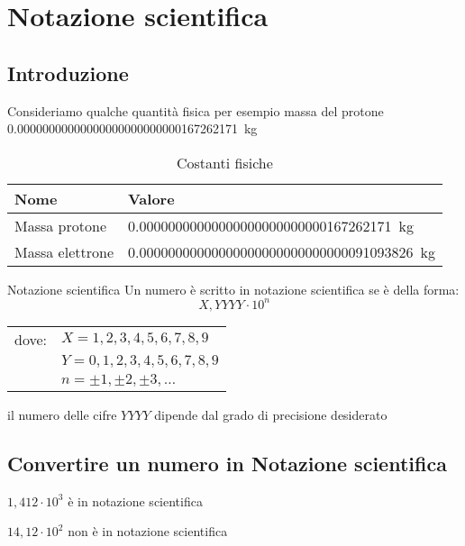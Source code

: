 \chapter{Notazione scientifica}
\section{Introduzione}
Consideriamo qualche quantità fisica per esempio massa del protone \SI{0,00000000000000000000000000167262171}{\kilogram}


\begin{table}
	\centering
	\begin{tabular}{ls}
		\toprule
		Nome&Valore\\
		\midrule
	Massa protone&\SI{0,00000000000000000000000000167262171}{\kilogram}\\
	Massa elettrone&\SI{0,00000000000000000000000000000091093826}{\kilogram}\\
		\bottomrule
	\end{tabular}
\caption{Costanti fisiche}
\label{tab:costantifisiche1}
\end{table}
\label{cha:NotazioneScientifica}
\begin{definizionet}{Notazione scientifica}{}
Un numero è scritto in notazione scientifica se è della forma:
\[X,YYYY \cdot 10^n \]
\begin{tabular}{ll}
dove:&    $X=1,2,3,4,5,6,7,8,9$  \\ 
	    &     $ Y=0,1,2,3,4,5,6,7,8,9$ \\ 
	   &  $n=\pm 1, \pm 2,\pm 3,\ldots$\\
\end{tabular}
 
il numero delle cifre $YYYY$ dipende dal grado di precisione desiderato
\end{definizionet}
\section{Convertire un numero in Notazione scientifica}
\begin{esempiot}{}{}
	$1,412\cdot 10^3$ è in notazione scientifica
	
	$14,12\cdot 10^2$ non è in notazione scientifica
\end{esempiot}